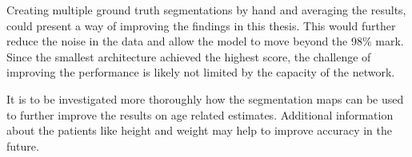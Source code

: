 Creating multiple ground truth segmentations by hand and averaging the results, could present a way of improving the findings in this thesis. This would further reduce the noise in the data and allow the model to move beyond the 98\% mark. Since the smallest architecture achieved the highest score, the challenge of improving the performance is likely not limited by the capacity of the network.

It is to be investigated more thoroughly how the segmentation maps can be used to further improve the results on age related estimates. Additional information about the patients like height and weight may help to improve accuracy in the future.

\newpage